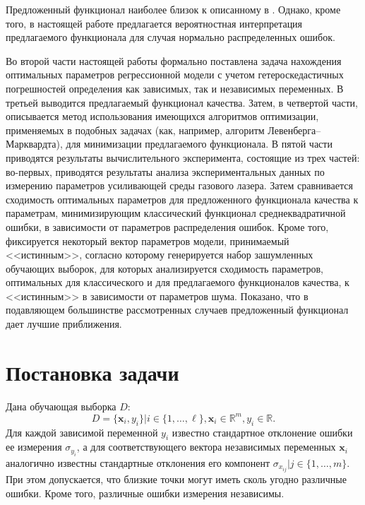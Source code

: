 \documentclass[tikz,10pt,a4paper]{article}
\begin{document}
Предложенный функционал наиболее близок к описанному в \cite{Boggs1987Stable}.
Однако, кроме того, в настоящей работе предлагается вероятностная интерпретация
предлагаемого функционала для случая нормально распределенных ошибок.

Во второй части настоящей работы формально поставлена задача нахождения
оптимальных параметров регрессионной модели с учетом гетероскедастичных
погрешностей определения как зависимых, так и независимых переменных.
В третьей выводится предлагаемый функционал качества.
Затем, в четвертой части, описывается метод использования имеющихся
алгоритмов оптимизации, применяемых в подобных задачах (как, например, алгоритм
Левенберга--Марквардта\cite{Marquardt1963Algorithm}), для минимизации
предлагаемого функционала. В пятой части приводятся результаты
вычислительного эксперимента, состоящие из трех частей: во-первых,
приводятся результаты анализа экспериментальных данных по измерению
параметров усиливающей среды газового лазера. Затем сравнивается сходимость
оптимальных параметров для предложенного функционала качества к параметрам,
минимизирующим классический функционал среднеквадратичной ошибки,
в зависимости от параметров
распределения ошибок. Кроме того, фиксируется некоторый вектор параметров
модели, принимаемый <<истинным>>, согласно которому генерируется набор
зашумленных обучающих выборок, для которых анализируется сходимость параметров,
оптимальных для классического и для предлагаемого функционалов качества,
к <<истинным>> в зависимости от параметров шума. Показано, что в подавляющем большинстве
рассмотренных случаев предложенный функционал дает лучшие приближения.

\section{Постановка задачи}

Дана обучающая выборка $D$:
\begin{equation}
  D = \{ \mathbf{x}_i, y_i \} | i \in \{ 1, \dots, \ell \}, \mathbf{x}_i \in \mathbb{R}^m, y_i \in \mathbb{R}.
  \label{eq:d}
\end{equation}
Для каждой зависимой переменной $y_i$ известно
стандартное отклонение ошибки ее измерения $\sigma_{y_i}$, а для соответствующего
вектора независимых переменных $\mathbf{x}_i$ аналогично известны стандартные
отклонения его компонент $\sigma_{x_{ij}} | j \in \{ 1, \dots, m \}$.
При этом допускается, что близкие точки могут иметь сколь угодно различные ошибки.
Кроме того, различные ошибки измерения независимы.
\end{document}
